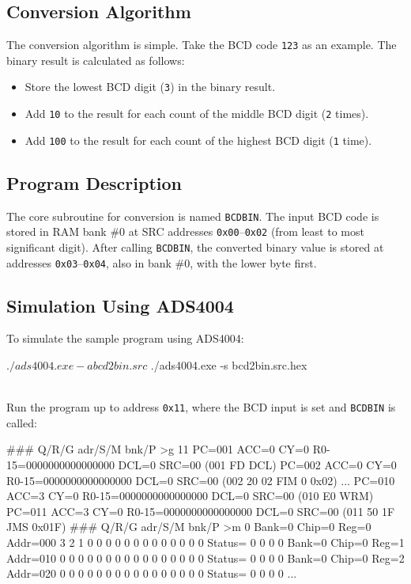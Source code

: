 \subsection{Conversion Algorithm}
The conversion algorithm is simple.  
Take the BCD code \texttt{123} as an example.  
The binary result is calculated as follows:
\begin{itemize}
  \item Store the lowest BCD digit (\texttt{3}) in the binary result.
  \item Add \texttt{10} to the result for each count of the middle BCD digit (\texttt{2} times).
  \item Add \texttt{100} to the result for each count of the highest BCD digit (\texttt{1} time).
\end{itemize}

\subsection{Program Description}
The core subroutine for conversion is named \texttt{BCDBIN}.  
The input BCD code is stored in RAM bank \#0 at SRC addresses \texttt{0x00}–\texttt{0x02} (from least to most significant digit).  
After calling \texttt{BCDBIN}, the converted binary value is stored at addresses \texttt{0x03}–\texttt{0x04}, also in bank \#0, with the lower byte first.

\subsection{Simulation Using ADS4004}
To simulate the sample program using ADS4004:\\

\begin{scriptsize}
\begin{boxedverbatim}
$ ./ads4004.exe -a bcd2bin.src
$ ./ads4004.exe -s bcd2bin.src.hex
\end{boxedverbatim}
\end{scriptsize}
\\

Run the program up to address \texttt{0x11}, where the BCD input is set and \texttt{BCDBIN} is called:\\

\begin{scriptsize}
\begin{boxedverbatim}
### Q/R/G adr/S/M bnk/P >g 11
  PC=001 ACC=0 CY=0 R0-15=0000000000000000 DCL=0 SRC=00  (001 FD       DCL)
  PC=002 ACC=0 CY=0 R0-15=0000000000000000 DCL=0 SRC=00  (002 20 02    FIM 0 0x02)
...
  PC=010 ACC=3 CY=0 R0-15=0000000000000000 DCL=0 SRC=00  (010 E0       WRM)
  PC=011 ACC=3 CY=0 R0-15=0000000000000000 DCL=0 SRC=00  (011 50 1F    JMS 0x01F)
### Q/R/G adr/S/M bnk/P >m 0
Bank=0 Chip=0 Reg=0 Addr=000  3 2 1 0 0 0 0 0 0 0 0 0 0 0 0 0  Status= 0 0 0 0
Bank=0 Chip=0 Reg=1 Addr=010  0 0 0 0 0 0 0 0 0 0 0 0 0 0 0 0  Status= 0 0 0 0
Bank=0 Chip=0 Reg=2 Addr=020  0 0 0 0 0 0 0 0 0 0 0 0 0 0 0 0  Status= 0 0 0 0
...
\end{boxedverbatim}
\end{scriptsize}
\\

